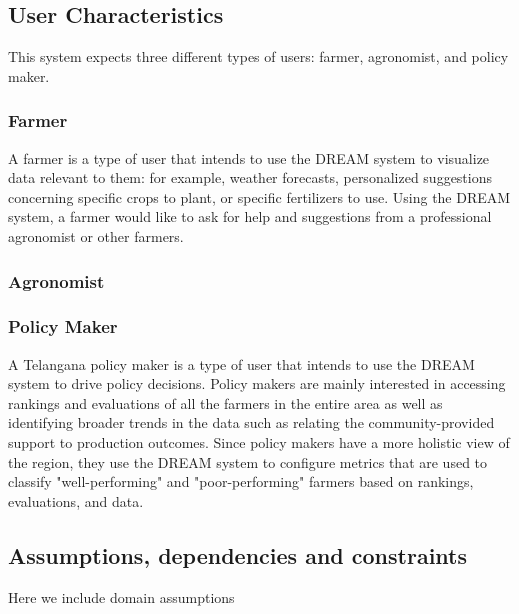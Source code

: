 \subsection{User Characteristics}
\begin{flushleft}
This system expects three different types of users: farmer, agronomist, and policy maker.
\subsubsection{Farmer}
A farmer is a type of user that intends to use the DREAM system to visualize data relevant to them: for example, weather forecasts, personalized suggestions concerning specific crops to plant, or specific fertilizers to use.
Using the DREAM system, a farmer would like to ask for help and suggestions from a professional agronomist or other farmers.\\
\subsubsection{Agronomist}
\subsubsection{Policy Maker}
A Telangana policy maker is a type of user that intends to use the DREAM system to drive policy decisions. Policy makers are mainly interested in accessing rankings and evaluations of all the farmers in the entire area as well as identifying broader trends in the data such as relating the community-provided support to production outcomes. Since policy makers have a more holistic view of the region, they use the DREAM system to configure metrics that are used to classify "well-performing" and "poor-performing" farmers based on rankings, evaluations, and data.\\
%



\end{flushleft}


\subsection{Assumptions, dependencies and constraints}
Here we include domain assumptions




